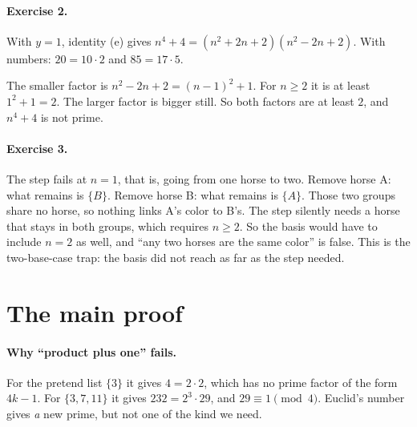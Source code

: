 \documentclass[11pt]{article}
\begin{document}
\paragraph{Exercise 2.} With $y = 1$, identity (e) gives $n^4 + 4 = (n^2 + 2n + 2)(n^2 - 2n + 2)$. With numbers: $20 = 10 \cdot 2$ and $85 = 17 \cdot 5$.

The smaller factor is $n^2 - 2n + 2 = (n-1)^2 + 1$. For $n \ge 2$ it is at least $1^2 + 1 = 2$. The larger factor is bigger still. So both factors are at least $2$, and $n^4 + 4$ is not prime.

\paragraph{Exercise 3.} The step fails at $n = 1$, that is, going from one horse to two. Remove horse A: what remains is $\{B\}$. Remove horse B: what remains is $\{A\}$. Those two groups share no horse, so nothing links A's color to B's. The step silently needs a horse that stays in both groups, which requires $n \ge 2$. So the basis would have to include $n = 2$ as well, and ``any two horses are the same color'' is false. This is the two-base-case trap: the basis did not reach as far as the step needed.

\section*{The main proof}

\paragraph{Why ``product plus one'' fails.} For the pretend list $\{3\}$ it gives $4 = 2 \cdot 2$, which has no prime factor of the form $4k - 1$. For $\{3, 7, 11\}$ it gives $232 = 2^3 \cdot 29$, and $29 \equiv 1 \pmod 4$. Euclid's number gives \emph{a} new prime, but not one of the kind we need.
\end{document}

